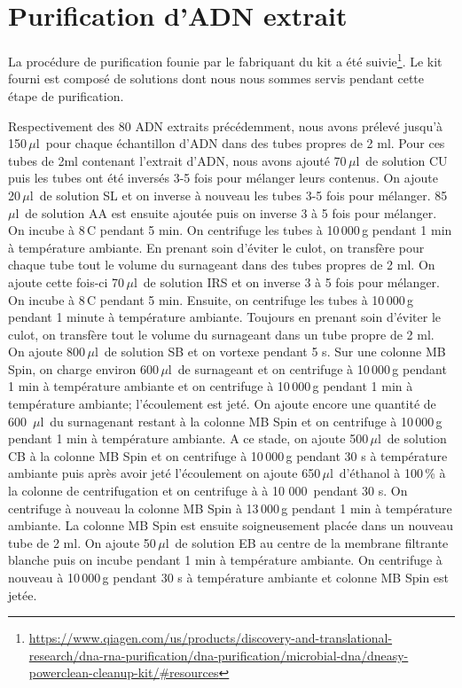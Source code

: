 \documentclass[a4paper,11pt]{article}
\begin{document}
\section{Purification d'ADN extrait}

La procédure de purification founie par le fabriquant du kit a été
suivie\footnote{\url{https://www.qiagen.com/us/products/discovery-and-translational-research/dna-rna-purification/dna-purification/microbial-dna/dneasy-powerclean-cleanup-kit/#resources}}.
Le kit fourni est composé de solutions dont nous nous sommes servis
pendant cette étape de purification.

Respectivement des 80 ADN extraits précédemment, nous avons prélevé
jusqu'à 150\,$\mu$l\, pour chaque échantillon d'ADN dans des tubes
propres de 2 ml. Pour ces tubes de 2ml contenant l'extrait d'ADN, nous
avons ajouté 70\,$\mu$l\, de solution CU puis les tubes ont été
inversés 3-5 fois pour mélanger leurs contenus. On ajoute 20\,$\mu$l\,
de solution SL et on inverse à nouveau les tubes 3-5 fois pour
mélanger.  85\,$\mu$l\, de solution AA est ensuite ajoutée puis on
inverse 3 à 5 fois pour mélanger. On incube à 8\,\degree{}C pendant 5
min.  On centrifuge les tubes à 10\,000\,g pendant 1 min à température
ambiante. En prenant soin d'éviter le culot, on transfère pour chaque
tube tout le volume du surnageant dans des tubes propres de 2 ml. On
ajoute cette fois-ci 70\,$\mu$l\, de solution IRS et on inverse 3 à 5
fois pour mélanger. On incube à 8\,\degree{}C pendant 5 min.  Ensuite,
on centrifuge les tubes à 10\,000\,g pendant 1 minute à température
ambiante. Toujours en prenant soin d'éviter le culot, on transfère
tout le volume du surnageant dans un tube propre de 2 ml. On ajoute
800\,$\mu$l\, de solution SB et on vortexe pendant 5 s. Sur une
colonne MB Spin, on charge environ 600\,$\mu$l\, de surnageant et on
centrifuge à 10\,000\,g pendant 1 min à température ambiante et on
centrifuge à 10\,000\,g pendant 1 min à température ambiante;
l'écoulement est jeté.  On ajoute encore une quantité de 600
\,$\mu$l\, du surnagenant restant à la colonne MB Spin et on
centrifuge à 10\,000\,g pendant 1 min à température ambiante.  A ce
stade, on ajoute 500\,$\mu$l\, de solution CB à la colonne MB Spin et
on centrifuge à 10\,000\,g pendant 30 s à température ambiante puis
après avoir jeté l'écoulement on ajoute 650\,$\mu$l\, d'éthanol à
100\,\% à la colonne de centrifugation et on centrifuge à à 10 000\,
pendant 30 s. On centrifuge à nouveau la colonne MB Spin à 13\,000\,g
pendant 1 min à température ambiante.  La colonne MB Spin est ensuite
soigneusement placée dans un nouveau tube de 2 ml. On ajoute
50\,$\mu$l\, de solution EB au centre de la membrane filtrante blanche
puis on incube pendant 1 min à température ambiante. On centrifuge à
nouveau à 10\,000\,g pendant 30 s à température ambiante et colonne MB
Spin est jetée.
\end{document}
